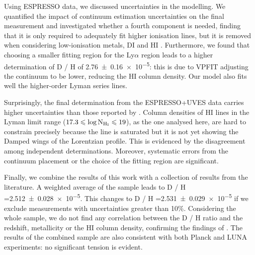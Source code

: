 \documentclass[fleqn,usenatbib]{mnras}
\makeatletter
\DeclareRobustCommand{\ion}[2]{%
  \mbox{#1\check@mathfonts\fontsize\sf@size\z@\selectfont #2}%
}
\makeatother
\begin{document}
Using ESPRESSO data, we discussed uncertainties in the modelling. We quantified the impact of continuum estimation uncertainties on the final measurement and investigated whether a fourth component is needed, finding that it is only required to adequately fit higher ionisation lines, but it is removed when considering low-ionisation metals, \ion{D}{I} and \ion{H}{I}. Furthermore, we found that choosing a smaller fitting region for the Ly$\alpha$ region leads to a higher determination of \ion{D}{}/\ion{H}{} of \num{2.76\pm0.16e-5}: this is due to VPFIT adjusting the continuum to be lower, reducing the \ion{H}{I} column density. Our model also fits well the higher-order Lyman series lines.

Surprisingly, the final determination from the ESPRESSO+UVES data carries higher uncertainties than those reported by .
Column densities of \ion{H}{I} lines in the Lyman limit range ($17.3 \le \log{\rm N_{H_I}} \le 19$), as the one analysed here, are hard to constrain precisely because the line is saturated but it is not yet showing the Damped wings of the Lorentzian profile. This is evidenced by the disagreement among independent determinations. Moreover, systematic errors from the continuum placement or the choice of the fitting region are significant.

Finally, we combine the results of this work with a collection of results from the literature. A weighted average of the sample leads to \ion{D}{}/\ion{H}{}=\num{2.512\pm 0.028e-5}. This changes to \ion{D}{}/\ion{H}{}=\num{2.531\pm 0.029e-5} if we exclude measurements with uncertainties greater than 10\%. Considering the whole sample, we do not find any correlation between the \ion{D}{}/\ion{H}{} ratio and the redshift, metallicity or the \ion{H}{I} column density, confirming the findings of \citet{cooke_18}. The results of the combined sample are also consistent with both Planck \citep{Planck_2018_cosmo_pars} and LUNA \citep{luna_deuterium} experiments: no significant tension is evident.
\end{document}
